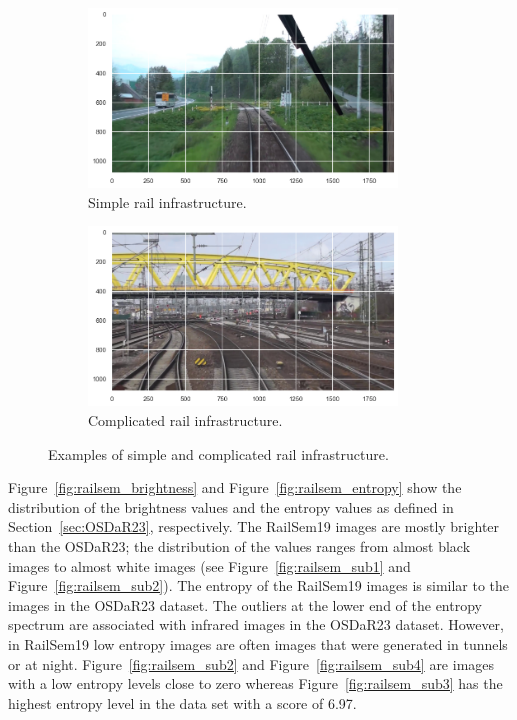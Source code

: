 \documentclass[Master,MDS,english]{BASE/twbook} %
\begin{document}
\begin{figure}
\centering
\begin{subfigure}[t]{.5\textwidth}
  \centering
  \includegraphics[width=0.9\textwidth]{images/datasets/railsem/example_2_tracks}
  \caption{Simple rail infrastructure.}
\end{subfigure}%
\begin{subfigure}[t]{.5\textwidth}
  \centering
  \includegraphics[width=0.9\textwidth]{images/datasets/railsem/example_52_tracks}
  \caption{Complicated rail infrastructure. }
\end{subfigure}
\caption{Examples of simple and complicated rail infrastructure.}
\label{fig:railsem_complicated_vs_simple}
\end{figure}


Figure~\ref{fig:railsem_brightness} and  Figure~\ref{fig:railsem_entropy} show the distribution of the brightness values and the entropy values as defined in Section~\ref{sec:OSDaR23}, respectively. The RailSem19 images are mostly brighter than the OSDaR23; the distribution of the values ranges from almost black images to almost white images (see Figure~\ref{fig:railsem_sub1} and Figure~\ref{fig:railsem_sub2}). The entropy of the RailSem19 images is similar to the images in the OSDaR23 dataset. The outliers at the lower end of the entropy spectrum are associated with infrared images in the OSDaR23 dataset. However, in RailSem19 low entropy images are often images that were generated in tunnels or at night. Figure~\ref{fig:railsem_sub2} and Figure~\ref{fig:railsem_sub4} are images with a low entropy levels close to zero whereas Figure~\ref{fig:railsem_sub3} has the highest entropy level in the data set with a score of 6.97.
\end{document}
